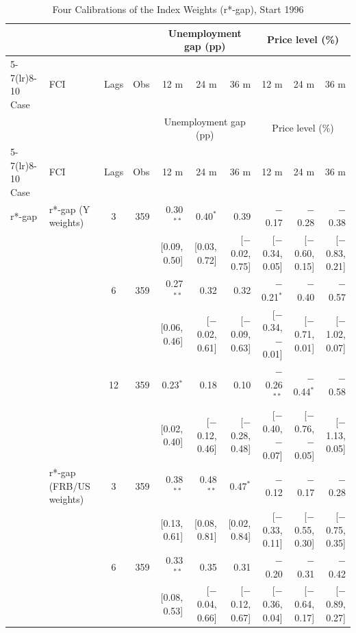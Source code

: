 \begingroup\scriptsize\setlength{\tabcolsep}{0.9pt}
\begin{longtable}{llcrrrrrrr}
\caption{Four Calibrations of the Index Weights (r*-gap), Start 1996}\label{tab:appR6}\\
\toprule
 & & & & \multicolumn{3}{c}{Unemployment gap (pp)} & \multicolumn{3}{c}{Price level (\%)}\\ \cmidrule(lr){5-7}\cmidrule(lr){8-10}
Case & FCI & Lags & Obs & 12 m & 24 m & 36 m & 12 m & 24 m & 36 m\\
\midrule\endfirsthead
\toprule
 & & & & \multicolumn{3}{c}{Unemployment gap (pp)} & \multicolumn{3}{c}{Price level (\%)}\\ \cmidrule(lr){5-7}\cmidrule(lr){8-10}
Case & FCI & Lags & Obs & 12 m & 24 m & 36 m & 12 m & 24 m & 36 m\\
\midrule\endhead
\bottomrule\endfoot
r*-gap & r*-gap (Y weights) & 3 & 359 & 0.30$^{**}$ & 0.40$^{*}$ & 0.39 & $-$0.17 & $-$0.28 & $-$0.38\\
 & & & & {\scriptsize [0.09, 0.50]} & {\scriptsize [0.03, 0.72]} & {\scriptsize [$-$0.02, 0.75]} & {\scriptsize [$-$0.34, 0.05]} & {\scriptsize [$-$0.60, 0.15]} & {\scriptsize [$-$0.83, 0.21]}\\
 &  & 6 & 359 & 0.27$^{**}$ & 0.32 & 0.32 & $-$0.21$^{*}$ & $-$0.40 & $-$0.57\\
 & & & & {\scriptsize [0.06, 0.46]} & {\scriptsize [$-$0.02, 0.61]} & {\scriptsize [$-$0.09, 0.63]} & {\scriptsize [$-$0.34, $-$0.01]} & {\scriptsize [$-$0.71, 0.01]} & {\scriptsize [$-$1.02, 0.07]}\\
 &  & 12 & 359 & 0.23$^{*}$ & 0.18 & 0.10 & $-$0.26$^{**}$ & $-$0.44$^{*}$ & $-$0.58\\
 & & & & {\scriptsize [0.02, 0.40]} & {\scriptsize [$-$0.12, 0.46]} & {\scriptsize [$-$0.28, 0.48]} & {\scriptsize [$-$0.40, $-$0.07]} & {\scriptsize [$-$0.76, $-$0.05]} & {\scriptsize [$-$1.13, 0.05]}\\
 & r*-gap (FRB/US weights) & 3 & 359 & 0.38$^{**}$ & 0.48$^{**}$ & 0.47$^{*}$ & $-$0.12 & $-$0.17 & $-$0.28\\
 & & & & {\scriptsize [0.13, 0.61]} & {\scriptsize [0.08, 0.81]} & {\scriptsize [0.02, 0.84]} & {\scriptsize [$-$0.33, 0.11]} & {\scriptsize [$-$0.55, 0.30]} & {\scriptsize [$-$0.75, 0.35]}\\
 &  & 6 & 359 & 0.33$^{**}$ & 0.35 & 0.31 & $-$0.20 & $-$0.31 & $-$0.42\\
 & & & & {\scriptsize [0.08, 0.53]} & {\scriptsize [$-$0.04, 0.66]} & {\scriptsize [$-$0.12, 0.67]} & {\scriptsize [$-$0.36, 0.04]} & {\scriptsize [$-$0.64, 0.17]} & {\scriptsize [$-$0.89, 0.27]}\\

\end{longtable}

